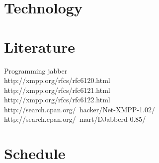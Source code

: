 \documentclass[a4paper,10pt,numbers=noendperiod]{scrartcl}
\begin{document}
\section{Technology}

\section{Literature}
Programming jabber\\
http://xmpp.org/rfcs/rfc6120.html\\
http://xmpp.org/rfcs/rfc6121.html\\
http://xmpp.org/rfcs/rfc6122.html\\
http://search.cpan.org/~hacker/Net-XMPP-1.02/\\
http://search.cpan.org/~mart/DJabberd-0.85/ \\



\section{Schedule}
\end{document}
